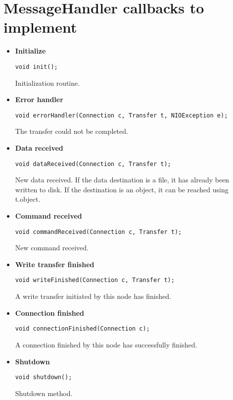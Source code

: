 \documentclass[10pt]{article}
\begin{document}
\section{MessageHandler callbacks to implement}
\begin{itemize}
	\item \textbf{Initialize}
	\begin{lstlisting}
void init();
	\end{lstlisting}
	Initialization routine.
	
	\item \textbf{Error handler}
	\begin{lstlisting}
void errorHandler(Connection c, Transfer t, NIOException e);
	\end{lstlisting}
	The transfer could not be completed.
	
	\item \textbf{Data received}
	\begin{lstlisting}
void dataReceived(Connection c, Transfer t);
	\end{lstlisting}
	New data received. If the data destination is a file, it has already been written to disk. If the destination is an object, it can be reached using t.object.
	
	\item \textbf{Command received}
	\begin{lstlisting}
void commandReceived(Connection c, Transfer t);
	\end{lstlisting}
	New command received.
	
	\item \textbf{Write transfer finished}
	\begin{lstlisting}
void writeFinished(Connection c, Transfer t);
	\end{lstlisting}
	A write transfer initiated by this node has finished.
	
	\item \textbf{Connection finished}
	\begin{lstlisting}
void connectionFinished(Connection c);
	\end{lstlisting}
	A connection finished by this node has successfully finished.
	
	\item \textbf{Shutdown}
	\begin{lstlisting}
void shutdown();
	\end{lstlisting}
	Shutdown method.
	
\end{itemize}
\end{document}
